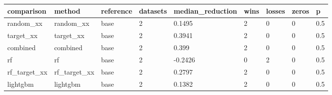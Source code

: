 \begin{tabular}{lllllllll}
\toprule
comparison & method & reference & datasets & median\_reduction & wins & losses & zeros & p \\
\midrule
random\_xx & random\_xx & base & 2 & 0.1495 & 2 & 0 & 0 & 0.5 \\
target\_xx & target\_xx & base & 2 & 0.3941 & 2 & 0 & 0 & 0.5 \\
combined & combined & base & 2 & 0.399 & 2 & 0 & 0 & 0.5 \\
rf & rf & base & 2 & -0.2426 & 0 & 2 & 0 & 0.5 \\
rf\_target\_xx & rf\_target\_xx & base & 2 & 0.2797 & 2 & 0 & 0 & 0.5 \\
lightgbm & lightgbm & base & 2 & 0.1382 & 2 & 0 & 0 & 0.5 \\
\bottomrule
\end{tabular}
